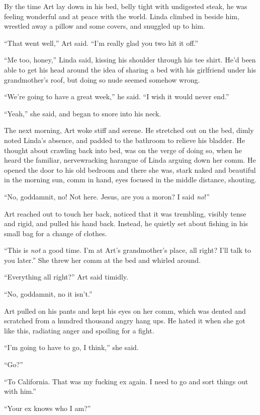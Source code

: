 By the time Art lay down in his bed, belly tight with undigested
steak, he was feeling wonderful and at peace with the world. Linda
climbed in beside him, wrestled away a pillow and some covers, and
snuggled up to him.

“That went well,” Art said. “I’m really glad you two hit it off.”

“Me too, honey,” Linda said, kissing his shoulder through his tee
shirt. He’d been able to get his head around the idea of sharing a
bed with his girlfriend under his grandmother’s roof, but doing so
nude seemed somehow wrong.

“We’re going to have a great week,” he said. “I wish it would never
end.”

“Yeah,” she said, and began to snore into his neck.

The next morning, Art woke stiff and serene. He stretched out on
the bed, dimly noted Linda’s absence, and padded to the bathroom to
relieve his bladder. He thought about crawling back into bed, was
on the verge of doing so, when he heard the familiar, nervewracking
harangue of Linda arguing down her comm. He opened the door to his
old bedroom and there she was, stark naked and beautiful in the
morning sun, comm in hand, eyes focused in the middle distance,
shouting.

“No, goddamnit, no! Not here. Jesus, are you a moron? I said
\emph{no}!”

Art reached out to touch her back, noticed that it was trembling,
visibly tense and rigid, and pulled his hand back. Instead, he
quietly set about fishing in his small bag for a change of
clothes.

“This is \emph{not} a good time. I’m at Art’s grandmother’s place,
all right? I’ll talk to you later.” She threw her comm at the bed
and whirled around.

“Everything all right?” Art said timidly.

“No, goddamnit, no it isn’t.”

Art pulled on his pants and kept his eyes on her comm, which was
dented and scratched from a hundred thousand angry hang ups. He
hated it when she got like this, radiating anger and spoiling for a
fight.

“I’m going to have to go, I think,” she said.

“Go?”

“To California. That was my fucking ex again. I need to go and sort
things out with him.”

“Your ex knows who I am?”

